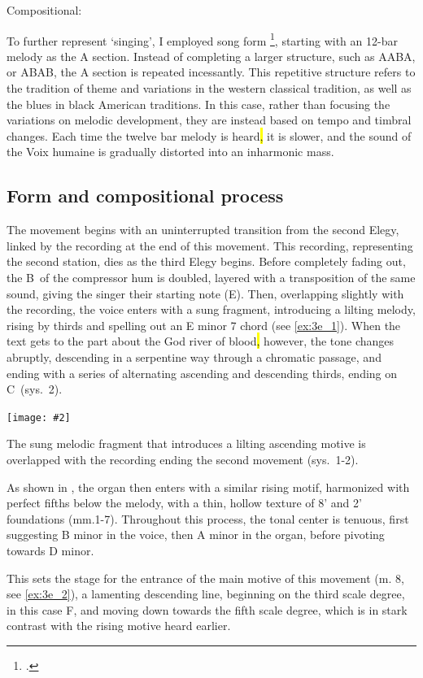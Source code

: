 \documentclass[12pt,twoside,maitrise]{dms_ks}
\newcommand{\customincludeexamples}[4][]{%
    \begin{example}[H]
        \centering
        \texttt{[image: \#2]}
        \caption{#4}
	\label{#3} 
    \end{example}
}
\theoremstyle{definition}
\begin{document}
{{Compositional:

To further represent `singing', I employed song form \footcite{owens_forms_2003}, starting with an 12-bar melody as the A section.
Instead of completing a larger structure, such as AABA, or ABAB, the A section is repeated incessantly.
This repetitive structure refers to the tradition of theme and variations in the western classical tradition, as well as the blues in black American traditions.  
In this case, rather than focusing the variations on melodic development, they are instead based on tempo and timbral changes. 
Each time the twelve bar melody is heard\hl{,} it is slower, and the sound of the Voix humaine is gradually distorted into an inharmonic mass.

\subsection{Form and compositional process}

The movement begins with an uninterrupted transition from the second Elegy, linked by the recording at the end of this movement. 
This recording, representing the second station, dies as the third Elegy begins. 
Before completely fading out, the B\na\ of the compressor hum is doubled, layered with a transposition of the same sound, giving the singer their starting note (E\na). 
Then, overlapping slightly with the recording, the voice enters with a sung fragment, introducing a lilting melody, rising by thirds and spelling out an E minor 7 chord (see \cref{ex:3e_1}). 
When the text gets to the part about the God river of blood\hl{,} however, the tone changes abruptly, descending in a serpentine way through a chromatic passage, and ending with a series of alternating ascending and descending thirds, ending on C\na\ (sys.~2).

\customincludeexamples[width=\textwidth]{3e_1}{ex:3e_1}{The sung melodic fragment that introduces a lilting ascending motive is overlapped with the recording ending the second movement (sys.~1-2).}

As shown in , the organ then enters with a similar rising motif, harmonized with perfect fifths below the melody, with a thin, hollow texture of 8' and 2' foundations (mm.1-7).
Throughout this process, the tonal center is tenuous, first suggesting B minor in the voice, then A minor in the organ, before pivoting towards D minor.  

This sets the stage for the entrance of the main motive of this movement (m. 8, see \cref{ex:3e_2}), a lamenting descending line, beginning on the third scale degree, in this case F, and moving down towards the fifth scale degree, which is in stark contrast with the rising motive heard earlier.  

}}
\end{document}
